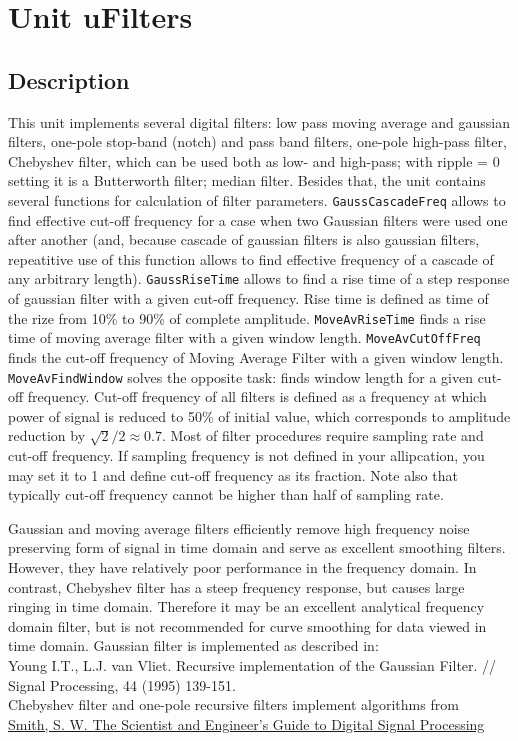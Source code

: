 \documentclass[12pt,a4paper,oneside]{report}
\newcommand{\lmathsix}[1]{   %
	\marginpar{\vspace{#1} 
		\begin{flushright}
			LMath 0.6
	\end{flushright} }
}
\newcommand{\code}[1]{\texttt{#1}}
\begin{document}
\section{Unit uFilters}\label{sec:uFilters}\lmathsix{-24pt}
\subsection{Description}\label{ufilters-description}
This unit implements several digital filters: low pass moving average and gaussian filters, one-pole stop-band (notch) and pass band filters, one-pole high-pass filter, Chebyshev filter, which can be used both as low- and high-pass; with ripple = 0 setting it is a Butterworth filter; median filter. Besides that, the unit contains several functions for calculation of filter parameters. \code{GaussCascadeFreq} allows to find effective cut-off frequency for a case when two Gaussian filters were used one after another (and, because cascade of gaussian filters is also gaussian filters, repeatitive use of this function allows to find effective frequency of a cascade of any arbitrary length). \code{GaussRiseTime} allows to find a rise time of a step response of gaussian filter with a given cut-off frequency. Rise time is defined as time of the rize from 10{\%} to 90{\%} of complete amplitude. \code{MoveAvRiseTime} finds a rise time of moving average filter with a given window length. \code{MoveAvCutOffFreq} finds the cut-off frequency of Moving Average Filter with a given window length. \code{MoveAvFindWindow} solves the opposite task: finds window length for a given cut-off frequency. Cut-off frequency of all filters is defined as a frequency at which power of signal is reduced to 50{\%} of initial value, which corresponds to amplitude reduction by $\sqrt{2}/2 \approx 0.7$. Most of filter procedures require sampling rate and cut-off frequency. If sampling frequency is not defined in your allipcation, you may set it to 1 and define cut-off frequency as its fraction. Note also that typically cut-off frequency cannot be higher than half of sampling rate.

Gaussian and moving average filters efficiently remove high frequency noise preserving form of signal in time domain and serve as excellent smoothing filters. However, they have relatively poor performance in the frequency domain. In contrast, Chebyshev filter has a steep frequency response, but causes large ringing in time domain. Therefore it may be an excellent analytical frequency domain filter, but is not recommended for curve smoothing for data viewed in time domain.
Gaussian filter is implemented as described in:\\
Young I.T., L.J. van Vliet. Recursive implementation of the Gaussian Filter. // Signal
Processing, 44 (1995) 139-151.\\
Chebyshev filter and one-pole recursive filters implement algorithms from \\
\href{http://www.dspguide.com/pdfbook.htm}{Smith, S. W. The Scientist and Engineer's Guide to Digital Signal Processing}
\end{document}
